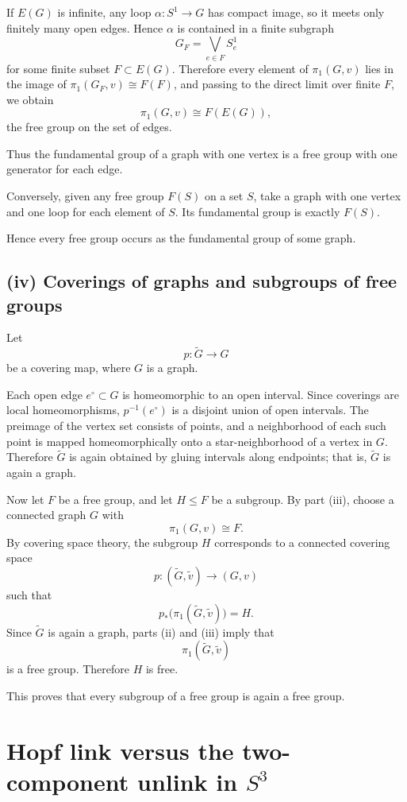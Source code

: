 \documentclass[12pt,a4paper]{article}
\theoremstyle{notespace}
\begin{document}
If \(E(G)\) is infinite, any loop \(\alpha:S^1\to G\) has compact image, so it meets only finitely many open edges. Hence \(\alpha\) is contained in a finite subgraph
\[
G_F=\bigvee_{e\in F} S^1_e
\]
for some finite subset \(F\subset E(G)\). Therefore every element of \(\pi_1(G,v)\) lies in the image of \(\pi_1(G_F,v)\cong F(F)\), and passing to the direct limit over finite \(F\), we obtain
\[
\pi_1(G,v)\cong F(E(G)),
\]
the free group on the set of edges.

Thus the fundamental group of a graph with one vertex is a free group with one generator for each edge.

Conversely, given any free group \(F(S)\) on a set \(S\), take a graph with one vertex and one loop for each element of \(S\). Its fundamental group is exactly \(F(S)\).

Hence every free group occurs as the fundamental group of some graph.

\subsection*{(iv) Coverings of graphs and subgroups of free groups}
Let
\[
p:\widetilde{G}\longrightarrow G
\]
be a covering map, where \(G\) is a graph.

Each open edge \(e^\circ\subset G\) is homeomorphic to an open interval. Since coverings are local homeomorphisms, \(p^{-1}(e^\circ)\) is a disjoint union of open intervals. The preimage of the vertex set consists of points, and a neighborhood of each such point is mapped homeomorphically onto a star-neighborhood of a vertex in \(G\). Therefore \(\widetilde{G}\) is again obtained by gluing intervals along endpoints; that is, \(\widetilde{G}\) is again a graph.

Now let \(F\) be a free group, and let \(H\leq F\) be a subgroup. By part (iii), choose a connected graph \(G\) with
\[
\pi_1(G,v)\cong F.
\]
By covering space theory, the subgroup \(H\) corresponds to a connected covering space
\[
p:(\widetilde{G},\widetilde{v})\to (G,v)
\]
such that
\[
p_*\bigl(\pi_1(\widetilde{G},\widetilde{v})\bigr)=H.
\]
Since \(\widetilde{G}\) is again a graph, parts (ii) and (iii) imply that
\[
\pi_1(\widetilde{G},\widetilde{v})
\]
is a free group. Therefore \(H\) is free.

This proves that every subgroup of a free group is again a free group.

\section{Hopf link versus the two-component unlink in \(S^3\)}
\end{document}

